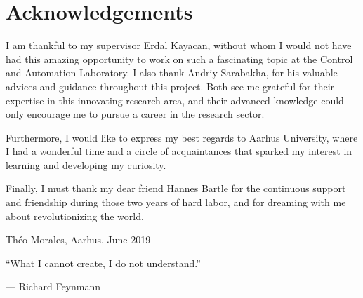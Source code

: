 \thispagestyle{plain}			%
\section*{Acknowledgements}

I am thankful to my supervisor Erdal Kayacan, without whom I would not have had
this amazing opportunity to work on such a fascinating topic at the Control and
Automation Laboratory. I also thank Andriy Sarabakha, for his valuable advices
and guidance throughout this project. Both see me grateful for their expertise
in this innovating research area, and their advanced knowledge could only
encourage me to pursue a career in the research sector.

Furthermore, I would like to express my best regards to Aarhus University,
where I had a wonderful time and a circle of acquaintances that sparked my
interest in learning and developing my curiosity.

Finally, I must thank my dear friend Hannes Bartle for the continuous support
and friendship during those two years of hard labor, and for dreaming with me
about revolutionizing the world. 

\vspace{1.5cm}
\hfill
Théo Morales, Aarhus, June 2019




\newpage				%
\vspace{8cm}
\epigraph{``What I cannot create, I do not understand.''}{--- \textup{Richard Feynmann}}
